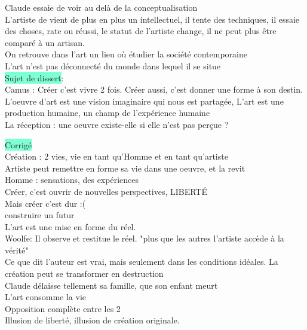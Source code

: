 \documentclass[a4paper,twocolumn,landscape]{article}
\begin{document}
\noindent Claude essaie de voir au delà de la conceptualisation\\
L'artiste de vient de plus en plus un intellectuel, il tente des techniques,
il essaie des choses, rate ou réussi, le statut de l'artiste change, il 
ne peut plus être comparé à un artisan.\\

\noindent On retrouve dans l'art un lieu où étudier la société 
contemporaine \\
L'art n'est pas déconnecté du monde dans lequel il se situe\\

\noindent \colorbox{Aquamarine}{Sujet de dissert}:\\
Camus : Créer c'est vivre 2 fois. Créer aussi, c'est donner 
une forme à son destin.\\

L'oeuvre d'art est une vision imaginaire qui nous est partagée,
L'art est une production humaine, un champ de l'expérience humaine\\ 

La réception : une oeuvre existe-elle si elle n'est pas perçue ? 

\noindent \colorbox{Aquamarine}{Corrigé}\\ 
Création : 2 vies, vie en tant qu'Homme et en tant qu'artiste\\ 
Artiste peut remettre en forme sa vie dans une oeuvre, et la revit\\
Homme : sensations, des expériences\\
Créer, c'est ouvrir de nouvelles perspectives, LIBERTÉ\\

\noindent Mais créer c'est dur :(\\ 
construire un futur \\ 

\noindent 
L'art est une mise en forme du réel. \\ 
Woolfe: Il observe et restitue le réel. "plus que les 
autres l'artiste accède à la vérité"\\ 
Ce que dit l'auteur est vrai, mais seulement dans les conditions 
idéales. La création peut se transformer en destruction \\ 
Claude délaisse tellement sa famille, que son enfant meurt\\ 
L'art consomme la vie\\ 
Opposition complète entre les 2\\ 
Illusion de liberté, illusion de création originale.\\ 
\end{document}
